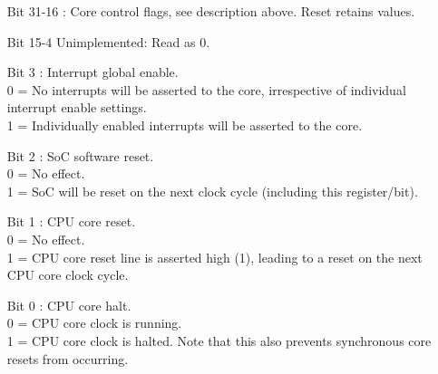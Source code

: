 \begin{itemize}[leftmargin=18mm,labelsep=3mm,parsep=1.5mm]
    \item[\footnotesize Bit 31-16] : Core control flags, see description above. Reset retains values.
    \item[\footnotesize Bit 15-4] Unimplemented: Read as 0.
    \item[\footnotesize Bit 3] : Interrupt global enable.\\{\footnotesize
    0 = No interrupts will be asserted to the core, irrespective of individual interrupt enable settings.\\
    1 = Individually enabled interrupts will be asserted to the core.}
    \item[\footnotesize Bit 2] : SoC software reset.\\{\footnotesize
    0 = No effect.\\
    1 = SoC will be reset on the next clock cycle (including this register/bit).}
    \item[\footnotesize Bit 1] : CPU core reset.\\{\footnotesize
    0 = No effect.\\
    1 = CPU core reset line is asserted high (1), leading to a reset on the next CPU core clock cycle.}
    \item[\footnotesize Bit 0] : CPU core halt.\\{\footnotesize
    0 = CPU core clock is running.\\
    1 = CPU core clock is halted. Note that this also prevents synchronous core resets from occurring.}
\end{itemize}

